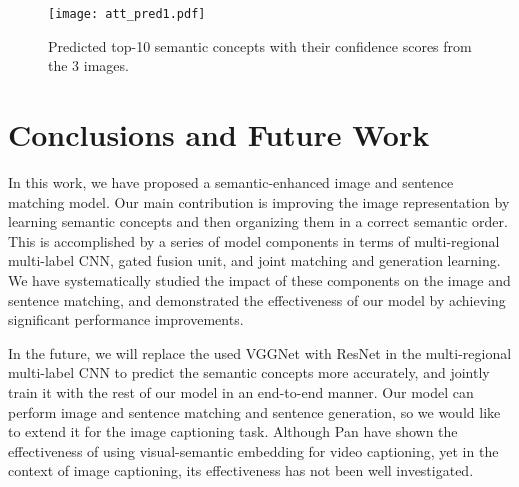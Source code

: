 \documentclass[10pt,twocolumn,letterpaper]{article}
\begin{document}
\begin{figure}[h]
\centering
\texttt{[image: att\_pred1.pdf]}
\caption{Predicted top-10 semantic concepts with their confidence scores from the 3 images.}
\label{figure:concept}
\end{figure}

\section{Conclusions and Future Work}
In this work, we have proposed a semantic-enhanced image and sentence matching model.
Our main contribution is improving the image representation by
learning semantic concepts and then organizing them in a correct semantic order.
This is accomplished by a series of model components in
terms of multi-regional multi-label CNN, gated fusion unit,
and joint matching and generation learning.
We have systematically studied the impact of these
components on the image and sentence matching,
and demonstrated the effectiveness of our model by achieving
significant performance improvements.

In the future, we will replace the used VGGNet with ResNet in the multi-regional
multi-label CNN to predict the semantic concepts more accurately,
and jointly train it with the rest of our model in an end-to-end manner.
Our model can perform image and sentence matching and sentence
generation, so we would like to extend it for the image captioning task.
Although Pan \etal \cite{pan2016jointly} have shown the effectiveness
of using visual-semantic embedding for video captioning,
yet in the context of image captioning, its effectiveness has not been
well investigated.

{\small


}
\end{document}
